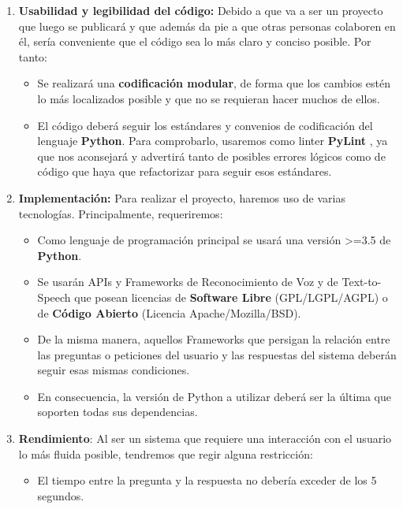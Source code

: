 \begin{enumerate}
	\item \textbf{Usabilidad y legibilidad del código:} Debido a que va a ser un proyecto que luego se publicará y que además da pie a que otras personas colaboren en él, sería conveniente que el código sea lo más claro y conciso posible. Por tanto:
	\begin{itemize}
		\item Se realizará una \textbf{codificación modular}, de forma que los cambios estén lo más localizados posible y que no se requieran hacer muchos de ellos.
		\item El código deberá seguir los estándares y convenios de codificación del lenguaje \textbf{Python}. Para comprobarlo, usaremos como linter \textbf{PyLint} \cite{pylint}, ya que nos aconsejará y advertirá tanto de posibles errores lógicos como de código que haya que refactorizar para seguir esos estándares.
	\end{itemize}

	\item \textbf{Implementación:} Para realizar el proyecto, haremos uso de varias tecnologías. Principalmente, requeriremos:
		\begin{itemize}
			\item Como lenguaje de programación principal se usará una versión >=3.5 de \textbf{Python}.
			\item Se usarán APIs y Frameworks de Reconocimiento de Voz y de Text-to-Speech que posean licencias de \textbf{Software Libre} (GPL/LGPL/AGPL) o de \textbf{Código Abierto} (Licencia Apache/Mozilla/BSD).
			\item De la misma manera, aquellos Frameworks que persigan la relación entre las preguntas o peticiones del usuario y las respuestas del sistema deberán seguir esas mismas condiciones.
			\item En consecuencia, la versión de Python a utilizar deberá ser la última que soporten todas sus dependencias.
		\end{itemize}
	
	\item \textbf{Rendimiento}: Al ser un sistema que requiere una interacción con el usuario lo más fluida posible, tendremos que regir alguna restricción:
	\begin{itemize}
		\item El tiempo entre la pregunta y la respuesta no debería exceder de los 5 segundos.
	\end{itemize}


\end{enumerate}
